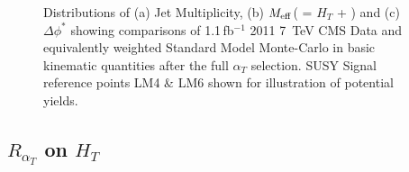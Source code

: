 \begin{figure}[htbp]
    \centering
     \newline

   
\caption{\label{fig:afterat}Distributions of (a) Jet Multiplicity, (b) $M_{\rm eff}$( = $H_{T}$ + \MHT) and (c) $\Delta \phi^{*}$ showing comparisons of 1.1\,fb$^{-1}$ 2011 7~TeV CMS Data and equivalently weighted Standard Model Monte-Carlo in basic kinematic quantities after the full $\alpha_{T}$ selection. SUSY Signal reference points LM4 \& LM6 shown for illustration of potential yields.}
\end{figure}

\subsection{$R_{\alpha_{T}}$ on $H_{T}$}

